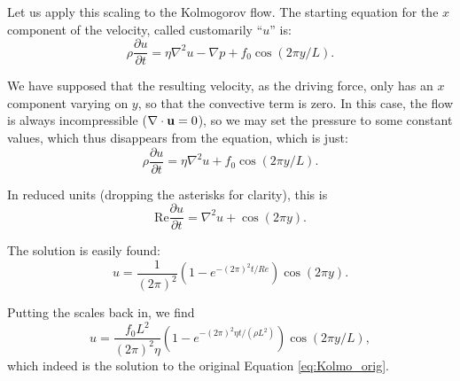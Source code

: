 Let us apply this scaling to the Kolmogorov flow. The starting
equation for the $x$ component of the velocity, called customarily
``$u$'' is:
\begin{equation}
\label{eq:Kolmo_orig}
  \rho \frac{\partial u}{\partial t} =
  \eta \nabla^2 u - \nabla p +   f_0 \cos(2\pi y/L)  .
\end{equation}

We have supposed that the resulting velocity, as the driving force,
only has an $x$ component varying on $y$, so that the convective term
is zero. In this case, the flow is always incompressible
($\nabla\cdot\mathbf{u} =0$), so we may set the pressure to some constant
values, which thus disappears from the equation, which is just:
\[
  \rho \frac{\partial u}{\partial t} =
  \eta \nabla^2 u +   f_0 \cos(2\pi y/L)  .
\]

In reduced units (dropping the asterisks for clarity), this is
\[
  \mathrm{Re} \frac{\partial u}{\partial t} = \nabla^2 u + \cos(2\pi y) .
\]

The solution is easily found:
\[
u = \frac{1}{(2\pi)^2} \left( 1-e^{ - (2\pi)^2 t/Re } \right)  \cos(2\pi y) .
\]

Putting the scales back in, we find
\[
u = \frac{ f_0 L^2 }{(2\pi)^2 \eta}
\left( 1-e^{- (2\pi)^2 \eta  t / (\rho L^2) } \right)  \cos(2\pi y/L) ,
\]
which indeed is the solution to the original Equation
\ref{eq:Kolmo_orig}.

